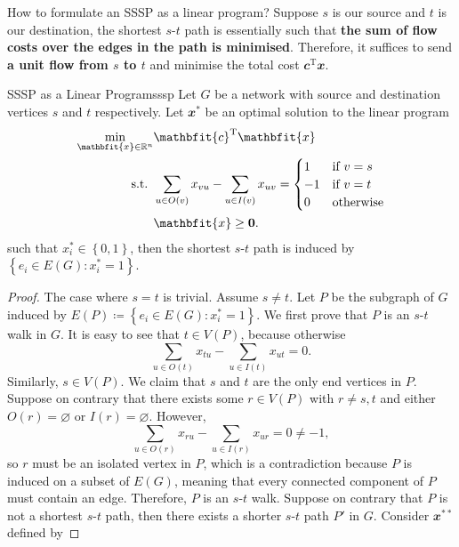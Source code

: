 \documentclass[math, code]{amznotes}
\theoremstyle{remark}
\begin{document}
How to formulate an SSSP as a linear program? Suppose $s$ is our source and $t$ is our destination, the shortest $s$-$t$ path is essentially such that \textbf{the sum of flow costs over the edges in the path is minimised}. Therefore, it suffices to send \textbf{a unit flow from $s$ to $t$} and minimise the total cost $\mathbfit{c}^{\mathrm{T}}\mathbfit{x}$.
\begin{probox}{SSSP as a Linear Program}{sssp}
    Let $G$ be a network with source and destination vertices $s$ and $t$ respectively. Let $\mathbfit{x}^*$ be an optimal solution to the linear program 
    \begin{align*}
        \min_{\mathbfit{x} \in \R^n} & \mathbfit{c}^{\mathrm{T}}\mathbfit{x} \\
        \textrm{s.t. } & \sum_{u \in O(v)}x_{vu} - \sum_{u \in I(v)}x_{uv} = \begin{cases}
            1 & \textrm{if } v = s \\
            -1 & \textrm{if } v = t \\
            0 & \textrm{otherwise}
        \end{cases} \\
        & \mathbfit{x} \geq \mathbf{0}.
    \end{align*}
    such that $x^*_i \in \left\{0, 1\right\}$, then the shortest $s$-$t$ path is induced by $\left\{e_i \in E(G) \colon x^*_i = 1\right\}$.
    \tcblower
    \begin{proof}
        The case where $s = t$ is trivial. Assume $s \neq t$. Let $P$ be the subgraph of $G$ induced by $E(P) \coloneqq \left\{e_i \in E(G) \colon x^*_i = 1\right\}$. We first prove that $P$ is an $s$-$t$ walk in $G$. It is easy to see that $t \in V(P)$, because otherwise 
        \begin{equation*}
            \sum_{u \in O(t)}x_{tu} - \sum_{u \in I(t)}x_{ut} = 0. 
        \end{equation*}
        Similarly, $s \in V(P)$. We claim that $s$ and $t$ are the only end vertices in $P$. Suppose on contrary that there exists some $r \in V(P)$ with $r \neq s, t$ and either $O(r) = \varnothing$ or $I(r) = \varnothing$. However, 
        \begin{equation*}
            \sum_{u \in O(r)}x_{ru} - \sum_{u \in I(r)}x_{ur} = 0 \neq -1,
        \end{equation*}
        so $r$ must be an isolated vertex in $P$, which is a contradiction because $P$ is induced on a subset of $E(G)$, meaning that every connected component of $P$ must contain an edge. Therefore, $P$ is an $s$-$t$ walk. Suppose on contrary that $P$ is not a shortest $s$-$t$ path, then there exists a shorter $s$-$t$ path $P'$ in $G$. Consider $\mathbfit{x}^{**}$ defined by 

\end{proof}
\end{probox}
\end{document}
